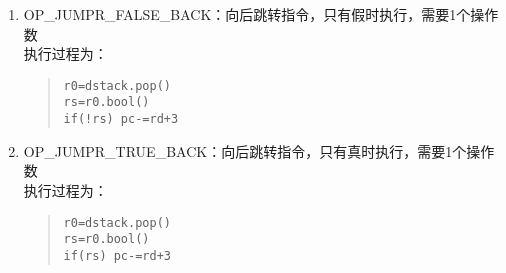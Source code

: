 \begin{enumerate}
\item OP\_JUMPR\_FALSE\_BACK：向后跳转指令，只有假时执行，需要1个操作数 \\
执行过程为：
\begin{quote}
\begin{verbatim}
r0=dstack.pop()
rs=r0.bool()
if(!rs) pc-=rd+3
\end{verbatim}
\end{quote}

\item OP\_JUMPR\_TRUE\_BACK：向后跳转指令，只有真时执行，需要1个操作数 \\
执行过程为：
\begin{quote}
\begin{verbatim}
r0=dstack.pop()
rs=r0.bool()
if(rs) pc-=rd+3
\end{verbatim}
\end{quote}
\end{enumerate}